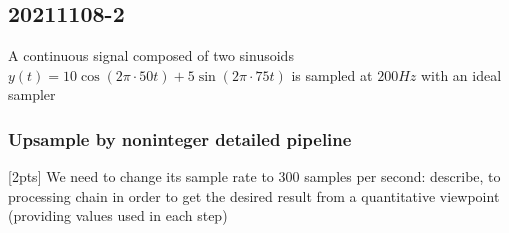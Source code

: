 
\pagebreak\subsection{20211108-2}
    A continuous signal composed of two sinusoids $y(t)=10\cos(2\pi\cdot 50t)+5\sin(2\pi\cdot 75t)$ is sampled at $200Hz$ with an ideal sampler
    
    \subsubsection{Upsample by noninteger detailed pipeline}
    [2pts] We need to change its sample rate to 300 samples per second: describe, to processing chain in order to get the desired result from a quantitative viewpoint (providing values used in each step)

